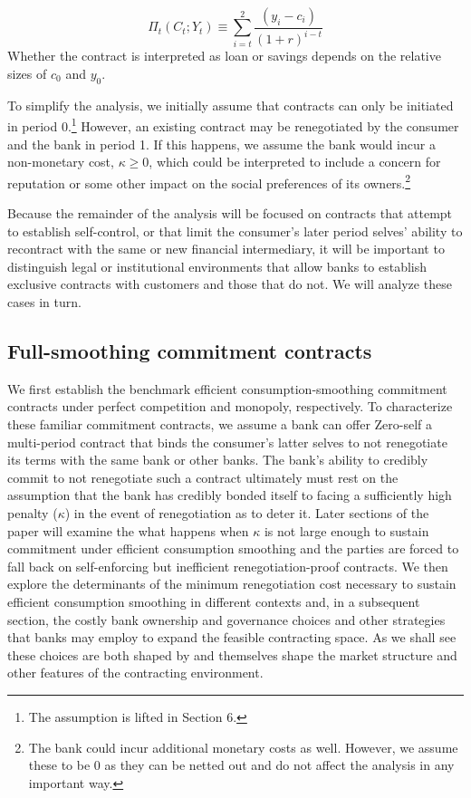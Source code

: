 \documentclass[11pt,english]{article}
\theoremstyle{plain}
\theoremstyle{definition}
\begin{document}
\begin{equation}
\Pi_{t}(C_{t};Y_{t})\equiv\sum\limits _{i=t}^{2}\frac{\left(y_{i}-c_{i}\right)}{\left(1+r\right)^{i-t}}\label{eq:profit}
\end{equation}
Whether the contract is interpreted as loan or savings depends on
the relative sizes of $c_{0}$ and $y_{0}$.

To simplify the analysis, we initially assume that contracts can only
be initiated in period 0.\footnote{The assumption is lifted in Section 6.}
However, an existing contract may be renegotiated by the consumer
and the bank in period 1. If this happens, we assume the bank would
incur a non-monetary cost, $\kappa\geq0$, which could be interpreted
to include a concern for reputation or some other impact on the social
preferences of its owners.\footnote{The bank could incur additional monetary costs as well. However, we
assume these to be 0 as they can be netted out and do not affect the
analysis in any important way.}

Because the remainder of the analysis will be focused on contracts
that attempt to establish self-control, or that limit the consumer's
later period selves' ability to recontract with the same or new financial
intermediary, it will be important to distinguish legal or institutional
environments that allow banks to establish exclusive contracts with
customers and those that do not. We will analyze these cases in turn.

\subsection{Full-smoothing commitment contracts }

We first establish the benchmark efficient consumption-smoothing commitment
contracts under perfect competition and monopoly, respectively. To
characterize these familiar commitment contracts, we assume a bank
can offer Zero-self a multi-period contract that binds the consumer's
latter selves to not renegotiate its terms with the same bank or other
banks. The bank's ability to credibly commit to not renegotiate such
a contract ultimately must rest on the assumption that the bank has
credibly bonded itself to facing a sufficiently high penalty ($\kappa$)
in the event of renegotiation as to deter it. Later sections of the
paper will examine the what happens when $\kappa$ is not large enough
to sustain commitment under efficient consumption smoothing and the
parties are forced to fall back on self-enforcing but inefficient
renegotiation-proof contracts. We then explore the determinants of
the minimum renegotiation cost necessary to sustain efficient consumption
smoothing in different contexts and, in a subsequent section, the
costly bank ownership and governance choices and other strategies
that banks may employ to expand the feasible contracting space. As
we shall see these choices are both shaped by and themselves shape
the market structure and other features of the contracting environment.
\end{document}
